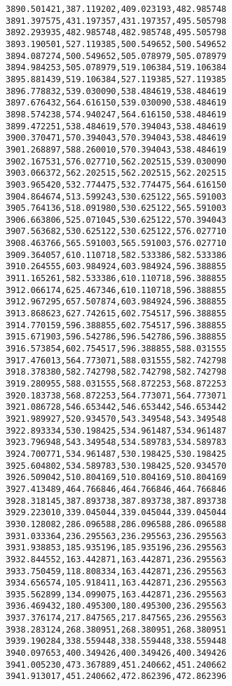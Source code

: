 \documentclass[11pt]{article}
\begin{document}
\begin{Verbatim}[commandchars=\\\{\}]
3890.501421,387.119202,409.023193,482.985748
3891.397575,431.197357,431.197357,495.505798
3892.293935,482.985748,482.985748,495.505798
3893.190501,527.119385,500.549652,500.549652
3894.087274,500.549652,505.078979,505.078979
3894.984253,505.078979,519.106384,519.106384
3895.881439,519.106384,527.119385,527.119385
3896.778832,539.030090,538.484619,538.484619
3897.676432,564.616150,539.030090,538.484619
3898.574238,574.940247,564.616150,538.484619
3899.472251,538.484619,570.394043,538.484619
3900.370471,570.394043,570.394043,538.484619
3901.268897,588.260010,570.394043,538.484619
3902.167531,576.027710,562.202515,539.030090
3903.066372,562.202515,562.202515,562.202515
3903.965420,532.774475,532.774475,564.616150
3904.864674,513.599243,530.625122,565.591003
3905.764136,518.091980,530.625122,565.591003
3906.663806,525.071045,530.625122,570.394043
3907.563682,530.625122,530.625122,576.027710
3908.463766,565.591003,565.591003,576.027710
3909.364057,610.110718,582.533386,582.533386
3910.264555,603.984924,603.984924,596.388855
3911.165261,582.533386,610.110718,596.388855
3912.066174,625.467346,610.110718,596.388855
3912.967295,657.507874,603.984924,596.388855
3913.868623,627.742615,602.754517,596.388855
3914.770159,596.388855,602.754517,596.388855
3915.671903,596.542786,596.542786,596.388855
3916.573854,602.754517,596.388855,588.031555
3917.476013,564.773071,588.031555,582.742798
3918.378380,582.742798,582.742798,582.742798
3919.280955,588.031555,568.872253,568.872253
3920.183738,568.872253,564.773071,564.773071
3921.086728,546.653442,546.653442,546.653442
3921.989927,520.934570,543.349548,543.349548
3922.893334,530.198425,534.961487,534.961487
3923.796948,543.349548,534.589783,534.589783
3924.700771,534.961487,530.198425,530.198425
3925.604802,534.589783,530.198425,520.934570
3926.509042,510.804169,510.804169,510.804169
3927.413489,464.766846,464.766846,464.766846
3928.318145,387.893738,387.893738,387.893738
3929.223010,339.045044,339.045044,339.045044
3930.128082,286.096588,286.096588,286.096588
3931.033364,236.295563,236.295563,236.295563
3931.938853,185.935196,185.935196,236.295563
3932.844552,163.442871,163.442871,236.295563
3933.750459,118.808334,163.442871,236.295563
3934.656574,105.918411,163.442871,236.295563
3935.562899,134.099075,163.442871,236.295563
3936.469432,180.495300,180.495300,236.295563
3937.376174,217.847565,217.847565,236.295563
3938.283124,268.380951,268.380951,268.380951
3939.190284,338.559448,338.559448,338.559448
3940.097653,400.349426,400.349426,400.349426
3941.005230,473.367889,451.240662,451.240662
3941.913017,451.240662,472.862396,472.862396

\end{Verbatim}
\end{document}
